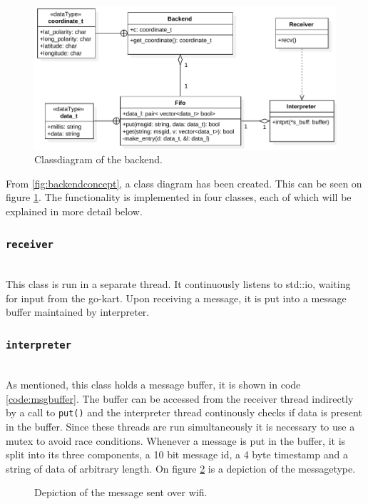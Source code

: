 \begin{figure}[H]
	\includegraphics[width=\linewidth]{graphics/backend_class_diagram}
	\caption[Backend class diagram.]{Classdiagram of the backend.}
	\label{fig:backendclass}
\end{figure}
From \ref{fig:backendconcept}, a class diagram has been created.
This can be seen on figure \ref{fig:backendclass}.
The functionality is implemented in four classes, each of which will be explained in more detail below.

\subsubsection{\texttt{receiver}}~\\
This class is run in a separate thread.
It continuously listens to std::io, waiting for input from the go-kart.
Upon receiving a message, it is put into a message buffer maintained by interpreter.
\subsubsection{\texttt{interpreter}}\label{sub:backend_intepreter}~\\
As mentioned, this class holds a message buffer, it is shown in code \ref{code:msgbuffer}.
The buffer can be accessed from the receiver thread indirectly by a call to \texttt{put()} and the interpreter thread continously checks if data is present in the buffer.
Since these threads are run simultaneously it is necessary to use a mutex to avoid race conditions.
Whenever a message is put in the buffer, it is split into its three components, a 10 bit message id, a 4 byte timestamp and a string of data of arbitrary length.
On figure \ref{fig:backendmsg} is a depiction of the messagetype.
\begin{figure}[H]
	\caption[Wifi Message.]{Depiction of the message sent over wifi.}
	\label{fig:backendmsg}
\end{figure}


